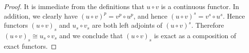 \documentclass[10pt,a4paper]{amsart}
\theoremstyle{plain}
\theoremstyle{definition}
\theoremstyle{remark}
\numberwithin{equation}{subsection}
\begin{document}
\begin{proof}
It is immediate from the definitions that $u \circ v$ is a continuous functor.
In addition, we clearly have $(u \circ v)^p = v^p \circ u^p$, and hence
$(u \circ v)^s = v^s \circ u^s$. Hence functors $(u \circ v)_s$  and
$u_s \circ v_s$ are both left adjoints of $(u \circ v)^s$. Therefore
$(u \circ v)_s \cong u_s \circ v_s$ and we conclude that $(u \circ v)_s$
is exact as a composition of exact functors.
\end{proof}
\end{document}
